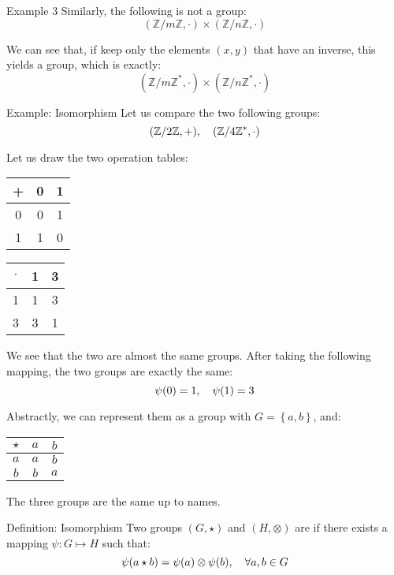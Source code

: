\documentclass[a4paper]{article}
\begin{document}
\begin{parag}{Example 3}
    Similarly, the following is not a group:
    \[\left(\mathbb{Z} / m\mathbb{Z}, \cdot\right) \times \left(\mathbb{Z}/n\mathbb{Z}, \cdot\right)\]

    We can see that, if keep only the elements $\left(x, y\right)$ that have an inverse, this yields a group, which is exactly:
    \[\left(\mathbb{Z} / m\mathbb{Z}^*, \cdot\right) \times \left(\mathbb{Z}/ n\mathbb{Z}^*, \cdot\right)\]
\end{parag}

\begin{parag}{Example: Isomorphism}
    Let us compare the two following groups:
    \[\left(\mathbb{Z} / 2\mathbb{Z}, +\right), \mathspace \left(\mathbb{Z} / 4\mathbb{Z}^*, \cdot\right)\]

    Let us draw the two operation tables:
    \begin{center}
    \begin{tabular}{c|cc}
        + & 0 & 1 \\
        \hline
        0 & 0 & 1 \\
        1 & 1 & 0
    \end{tabular}
    \hspace{1em}
    \begin{tabular}{c|cc}
        $\cdot$ & 1 & 3 \\
        \hline
        1 & 1 & 3 \\
        3 & 3 & 1
    \end{tabular}
    \end{center}

    We see that the two are almost the same groups. After taking the following mapping, the two groups are exactly the same:
    \[\psi\left(0\right) = 1, \mathspace \psi\left(1\right) = 3\]

    Abstractly, we can represent them as a group with $G = \left\{a, b\right\}$, and:
    \begin{center}
    \begin{tabular}{c|cc}
        $\star$ & $a$ & $b$ \\
        \hline
        $a$ & $a$ & $b$ \\
        $b$ & $b$ & $a$
    \end{tabular}
    \end{center}

    The three groups are the same up to names.
\end{parag}

\begin{parag}{Definition: Isomorphism}
    Two groups $\left(G, \star\right)$ and $\left(H, \otimes\right)$ are  if there exists a mapping $\psi: G \mapsto H$ such that:
    \[\psi\left(a \star b\right) = \psi\left(a\right) \otimes \psi\left(b\right), \mathspace \forall a, b \in G\]
\end{parag}
\end{document}
